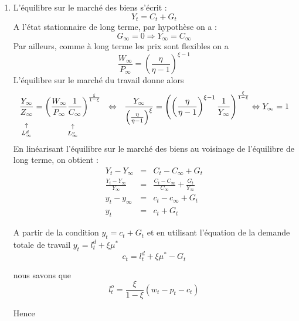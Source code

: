 \documentclass[a4paper,11pt]{article}
\begin{document}
\begin{enumerate}
\item L'\'{e}quilibre sur le march\'{e} des biens s'\'{e}crit :%
\begin{equation*}
Y_{t}=C_{t}+G_{t}
\end{equation*}%
A l'\'{e}tat stationnaire de long terme, par hypoth\`{e}se on a :%
\begin{equation*}
G_{\infty }=0\Rightarrow Y_{\infty }=C_{\infty }
\end{equation*}%
Par ailleurs, comme \`{a} long terme les prix sont flexibles on a%
\begin{equation*}
\frac{W_{\infty }}{P_{\infty }}=\left( \frac{\eta }{\eta -1}\right) ^{\xi -1}
\end{equation*}%
L'\'{e}quilibre sur le march\'{e} du travail donne alors 
\begin{equation*}
\underset{L_{\infty }^{d}}{\underset{\uparrow }{\underset{}{\frac{Y_{\infty }%
}{Z_{\infty }}}}}=\underset{L_{\infty }^{o}}{\underset{\uparrow }{\underset{}%
{\left( \frac{W_{\infty }}{P_{\infty }}\frac{1}{C_{\infty }}\right) ^{\frac{%
\xi }{1-\xi }}}}}\ \ \Leftrightarrow \ \ \frac{Y_{\infty }}{\left( \frac{%
\eta }{\eta -1}\right) ^{\xi }}=\left( \left( \frac{\eta }{\eta -1}\right)
^{\xi -1}\frac{1}{Y_{\infty }}\right) ^{\frac{\xi }{1-\xi }}\Leftrightarrow
Y_{\infty }=1
\end{equation*}%
En lin\'{e}arisant l'\'{e}quilibre sur le march\'{e} des biens au voisinage
de l'\'{e}quilibre de long terme, on obtient :%
\begin{eqnarray*}
Y_{t}-Y_{\infty } &=&C_{t}-C_{\infty }+G_{t} \\
\frac{Y_{t}-Y_{\infty }}{Y_{\infty }} &=&\frac{C_{t}-C_{\infty }}{C_{\infty }%
}+\frac{G_{t}}{Y_{\infty }} \\
y_{t}-y_{\infty } &=&c_{t}-c_{\infty }+G_{t} \\
y_{t} &=&c_{t}+G_{t}
\end{eqnarray*}

A partir de la condition $ y_t = c_t + G_t $ et en utilisant l'équation de la demande totale de travail $y_{t}= l_t^d + \xi \mu ^{\ast }$
\begin{equation*}
c_{t}= l_t^d + \xi \mu ^{\ast }-G_t
\end{equation*}



nous savons que \begin{equation*}
l_{t}^{o}=\frac{\xi}{1-\xi}(w_{t}-p_{t}-c_{t}) 
\end{equation*}

Hence


\end{enumerate}
\end{document}
